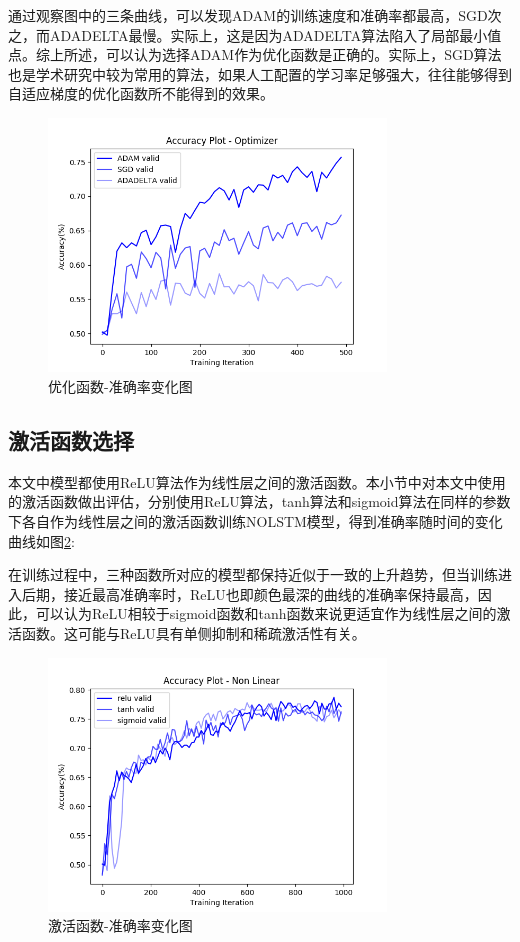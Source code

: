 通过观察图中的三条曲线，可以发现ADAM的训练速度和准确率都最高，SGD次之，而ADADELTA最慢。实际上，这是因为ADADELTA算法陷入了局部最小值点。综上所述，可以认为选择ADAM作为优化函数是正确的。实际上，SGD算法也是学术研究中较为常用的算法，如果人工配置的学习率足够强大，往往能够得到自适应梯度的优化函数所不能得到的效果。
\begin{center}
\begin{figure}[!hbp]
\includegraphics[width=0.8\textwidth]{graphic/opt.png}
\caption{优化函数-准确率变化图 \label{fopt}}
\end{figure}
\end{center}
\subsection{激活函数选择}
本文中模型都使用ReLU算法作为线性层之间的激活函数。本小节中对本文中使用的激活函数做出评估，分别使用ReLU算法，tanh算法和sigmoid算法在同样的参数下各自作为线性层之间的激活函数训练NOLSTM模型，得到准确率随时间的变化曲线如图\ref{fnonlinear}:


在训练过程中，三种函数所对应的模型都保持近似于一致的上升趋势，但当训练进入后期，接近最高准确率时，ReLU也即颜色最深的曲线的准确率保持最高，因此，可以认为ReLU相较于sigmoid函数和tanh函数来说更适宜作为线性层之间的激活函数。这可能与ReLU具有单侧抑制和稀疏激活性有关。
\begin{center}
\begin{figure}[!hbp]
\includegraphics[width=0.8\textwidth]{graphic/nonlinear.png}
\caption{激活函数-准确率变化图 \label{fnonlinear}}
\end{figure}
\end{center}
